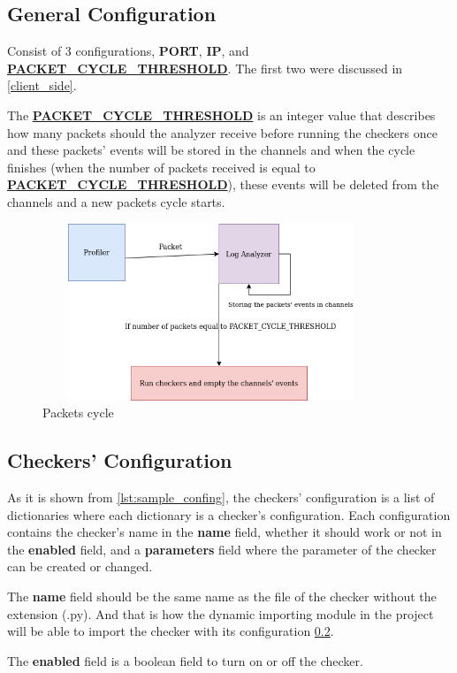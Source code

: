 \subsection{General Configuration} \label{g_config}
Consist of 3 configurations, \textbf{PORT}, \textbf{IP}, 
and \textbf{\url{PACKET_CYCLE_THRESHOLD}}. The first two were discussed in \ref{client_side}.

The \textbf{\url{PACKET_CYCLE_THRESHOLD}} is an integer value that describes
how many packets should the analyzer receive before running the checkers once
and these packets' events will be stored in the channels and when the cycle
finishes (when the number of packets received is equal to \textbf{\url{PACKET_CYCLE_THRESHOLD}}), these
events will be deleted from the channels and a new packets cycle starts.

\begin{figure}[H]
	\centering
	\includegraphics[width=0.9\textwidth,height=200px]{images/packets_cycle.png}
	\caption{Packets cycle}
	\label{fig:packets_cycle}
\end{figure}

\subsection{Checkers' Configuration}
As it is shown from \ref{lst:sample_confing}, the checkers' configuration is a
list of dictionaries where each dictionary is a checker's configuration. Each configuration
contains the checker's name in the \textbf{name} field, whether it should work or not in
the \textbf{enabled} field, and a \textbf{parameters} field where the parameter
of the checker can be created or changed.

The \textbf{name} field should be the same name as the file of the checker 
without the extension (.py). And that is how the dynamic importing module in 
the project will be able to import the checker with its configuration \ref{}.

The \textbf{enabled} field is a boolean field to turn on or off the checker.

